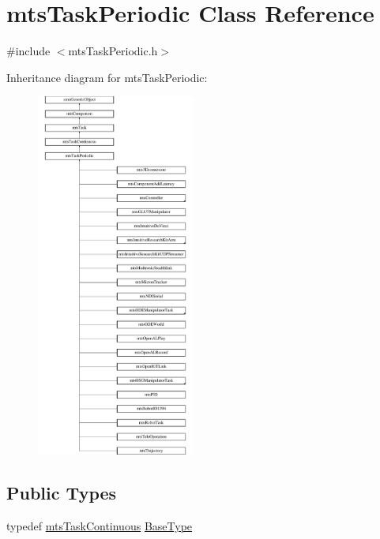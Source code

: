 \hypertarget{classmts_task_periodic}{}\section{mts\+Task\+Periodic Class Reference}
\label{classmts_task_periodic}


{\ttfamily \#include $<$mts\+Task\+Periodic.\+h$>$}

Inheritance diagram for mts\+Task\+Periodic\+:\begin{figure}[H]
\begin{center}
\leavevmode
\includegraphics[height=12.000000cm]{d5/df4/classmts_task_periodic}
\end{center}
\end{figure}
\subsection*{Public Types}
\begin{DoxyCompactItemize}
\item 
typedef \hyperlink{classmts_task_continuous}{mts\+Task\+Continuous} \hyperlink{classmts_task_periodic_ae0e61abd9d99d5c58d97bfd2401ebd6e}{Base\+Type}
\end{DoxyCompactItemize}
